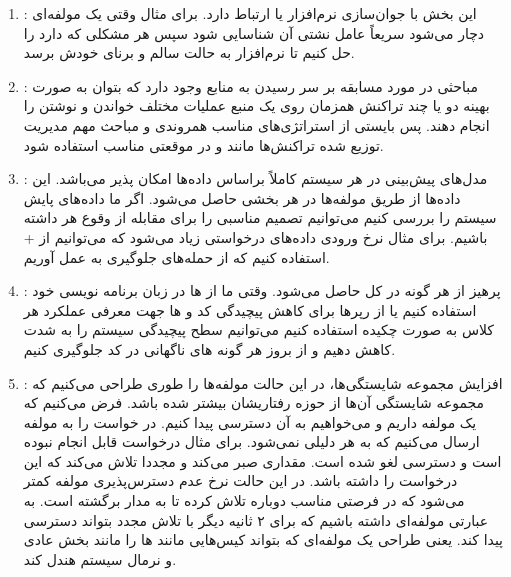 \begin{enumerate}
    \item {}: این بخش با جوان‌سازی نرم‌افزار یا
     ارتباط دارد. برای مثال وقتی یک مولفه‌ای دچار
     می‌شود سریعاً عامل نشتی آن شناسایی شود سپس هر مشکلی که دارد
    را حل کنیم تا نرم‌افزار به حالت سالم و برنای خودش برسد.
    \item {}: مباحثی در مورد مسابقه بر سر رسیدن به منابع وجود
    دارد که بتوان به صورت بهینه دو یا چند تراکنش همزمان روی یک منبع عملیات مختلف
    خواندن و نوشتن را انجام دهند. پس بایستی از استراتژی‌های مناسب همروندی و
    مباحث مهم مدیریت توزیع شده تراکنش‌ها مانند  و  در موقعتی
    مناسب استفاده شود.
    \item {}: مدل‌های پیش‌بینی در هر سیستم کاملاً براساس
    داده‌ها امکان پذیر می‌باشد. این داده‌ها از طریق  مولفه‌ها در
    هر بخشی حاصل می‌شود. اگر ما داده‌های پایش سیستم را بررسی کنیم می‌توانیم
    تصمیم مناسبی را برای مقابله از وقوع هر  داشته باشیم. برای مثال نرخ
    ورودی داده‌های درخواستی زیاد می‌شود که می‌توانیم از  +
     استفاده کنیم که از حمله‌های  جلوگیری به عمل آوریم.
    \item {}: پرهیز از هر گونه  در کل حاصل
    می‌شود. وقتی ما از ها در زبان برنامه نویسی خود استفاده
    کنیم یا از رپر‌ها برای کاهش پیچیدگی کد و ها جهت
    معرفی عملکرد هر کلاس به صورت چکیده استفاده کنیم می‌توانیم سطح پیچیدگی سیستم
    را به شدت کاهش دهیم و از بروز هر گونه های ناگهانی در کد
    جلوگیری کنیم.
    \item {}: افزایش مجموعه شایستگی‌ها، در این حالت
    مولفه‌ها را طوری طراحی می‌کنیم که مجموعه شایستگی آن‌ها از حوزه رفتاریشان
    بیشتر شده باشد. فرض می‌کنیم که یک مولفه داریم و می‌خواهیم به آن دسترسی پیدا
    کنیم. در خواست را به مولفه‌ ارسال می‌کنیم که به هر دلیلی 
    نمی‌شود. برای مثال درخواست قابل انجام نبوده است و دسترسی لغو شده است. مقداری
    صبر می‌کند و مجددا تلاش می‌کند که این درخواست را داشته باشد. در این حالت نرخ
    عدم دسترس‌پذیری مولفه کمتر می‌شود که در فرصتی مناسب دوباره تلاش کرده تا به
    مدار برگشته است. به عبارتی مولفه‌ای داشته باشیم که برای ۲ ثانیه دیگر با تلاش
    مجدد بتواند دسترسی پیدا کند. یعنی طراحی یک مولفه‌ای که بتواند کیس‌هایی مانند
    ها را مانند بخش عادی و نرمال سیستم هندل کند.
\end{enumerate}